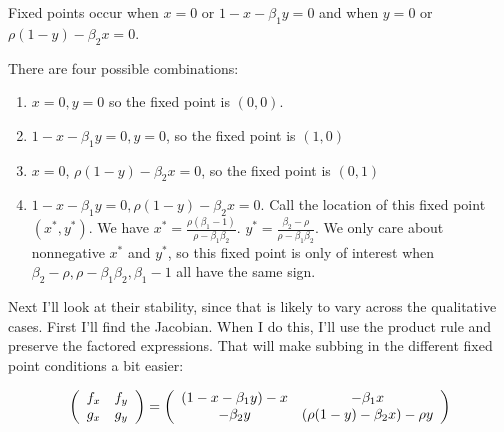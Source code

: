 \documentclass[12pt,letterpaper,answers]{exam}
\begin{document}
\begin{questions}
\begin{parts}
\begin{solution}
Fixed points occur when $x = 0$ or $1-x - \beta_1 y = 0$ and when $y = 0$ or $\rho(1-y) - \beta_2 x = 0$.

There are four possible combinations:
\begin{enumerate}
\item $x = 0, y = 0$ so the fixed point is $(0,0)$.
\item  $1 - x - \beta_1 y = 0, y = 0$, so the fixed point is $(1,0)$
\item   $x = 0$, $\rho(1-y)-\beta_2 x = 0$, so the fixed point is $(0,1)$
\item  $1-x-\beta_1 y = 0, \rho(1-y) - \beta_2 x = 0$.  Call the location of this fixed point $(x^*, y^*)$.  We have $\displaystyle x^* = \frac{\rho(\beta_1 - 1)}{\rho - \beta_1 \beta_2}$.  $\displaystyle y^* = \frac{\beta_2 - \rho}{\rho - \beta_1 \beta_2}$.  We only care about nonnegative $x^*$ and $y^*$, so this fixed point is only of interest when $\beta_2 - \rho, \rho - \beta_1\beta_2, \beta_1 - 1$ all have the same sign.
\end{enumerate}

Next I'll look at their stability, since that is likely to vary across the qualitative cases.  First I'll find the Jacobian.  When I do this, I'll use the product rule and preserve the factored expressions.  That will make subbing in the different fixed point conditions a bit easier:

\[\left(\begin{array}{c c} f_x & f_y \\ g_x  & g_y \end{array}\right) = \left(\begin{array}{c c} (1-x-\beta_1 y) - x & -\beta_1 x \\ -\beta_2 y & (\rho(1-y) - \beta_2 x) - \rho y  \end{array}\right) \]


\end{solution}
\end{parts}
\end{questions}
\end{document}
